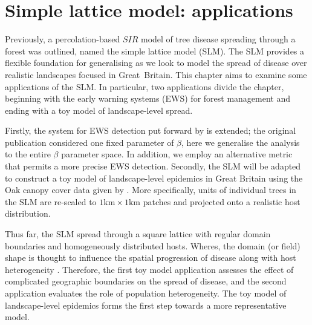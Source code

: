 
\chapter{Simple lattice model: applications}
\label{chapter:SLM-applications}

Previously, a percolation-based $SIR$ model of tree disease spreading through a forest was outlined, named the simple lattice model (SLM).
The SLM provides a flexible foundation for generalising as we look to model the spread of disease over realistic landscapes focused in Great Britain.
This chapter aims to examine some applications of the SLM.
In particular, two applications divide the chapter, beginning with the early warning systems (EWS) for forest management and ending with a toy model of landscape-level spread.

Firstly, the system for EWS detection put forward by \cite{OROZCOFUENTES201912} is extended; the original publication considered one fixed parameter of $\beta$, here we generalise the analysis to the entire $\beta$ parameter space. In addition, we employ an alternative metric that permits a more precise EWS detection.
Secondly, the SLM will be adapted to construct a toy model of landscape-level epidemics in Great Britain using the Oak canopy cover data given
by \cite{hill.data}. More specifically, units of individual trees in the SLM are re-scaled to $\mathrm{1km \times 1km}$ patches and projected onto a realistic host distribution.

Thus far, the SLM spread through a square lattice with regular domain boundaries and homogeneously distributed hosts.
Wheres, the domain (or field) shape is thought to influence the spatial progression of disease \cite{mikaberidze2016invasiveness} along with host heterogeneity \cite{madden1995plant}.
Therefore, the first toy model application assesses the effect of complicated geographic boundaries on the spread of disease, and
the second application evaluates the role of population heterogeneity.
The toy model of landscape-level epidemics forms the first step towards a more representative model.

